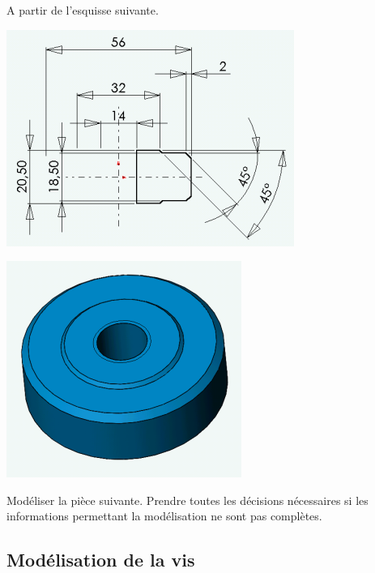 \begin{minipage}{0.4\linewidth}
A partir de l'esquisse suivante.
\end{minipage}
\hfill
\begin{minipage}{0.58\linewidth}
\includegraphics[width=0.8\linewidth]{img/029}
\end{minipage}

\begin{minipage}{0.3\linewidth}
\includegraphics[width=0.7\linewidth]{img/026}
\end{minipage}
\hfill
\begin{minipage}{0.68\linewidth}
Modéliser la pièce suivante. Prendre toutes les décisions nécessaires si les informations permettant la modélisation ne sont pas complètes.
\end{minipage}

\subsection{Modélisation de la vis}

